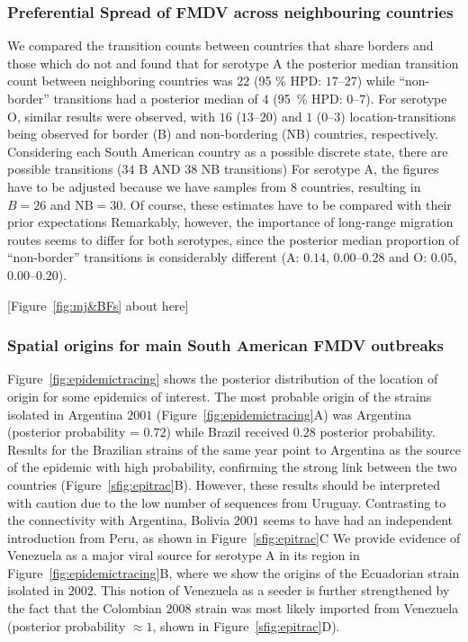 \documentclass[10pt]{article}
\begin{document}
\subsubsection*{Preferential Spread of FMDV across neighbouring countries}
We compared the transition counts between countries that share borders and those which do not and found that for serotype A the posterior median transition count between neighboring countries was  $22$ (95 \% HPD: $17$--$27$) while ``non-border'' transitions had a posterior median of $4$ (95~\% HPD: $0$--$7$). For serotype O, similar results were observed, with $16$ ($13$--$20$) and $1$ ($0$--$3$) location-transitions being observed for border (B) and non-bordering (NB) countries, respectively.
Considering each South American country as a possible discrete state, there are  possible transitions ($34$ B AND $38$ NB transitions)
For serotype A, the figures have to be adjusted because we have samples from $8$ countries, resulting in $B = 26$ and $ \text{NB} = 30$.
Of course, these estimates have to be compared with their prior expectations
Remarkably, however, the importance of long-range migration routes seems to differ for both serotypes, since the posterior median proportion of ``non-border'' transitions is considerably different (A: $0.14$, $0.00$--$0.28$  and O: $0.05$, $0.00$--$0.20$).

\begin{center}
 [Figure~\ref{fig:mj&BFs} about here]
\end{center}

\subsubsection*{Spatial origins for main South American FMDV outbreaks}

Figure~\ref{fig:epidemictracing} shows the posterior distribution of the location of origin for some epidemics of interest.
The most probable origin of the strains isolated in Argentina $2001$ (Figure~\ref{fig:epidemictracing}A) was Argentina (posterior probability = $0.72$) while Brazil received $0.28$ posterior probability.
Results for the Brazilian strains of the same year point to Argentina as the source of the epidemic with high probability, confirming the strong link between the two countries (Figure~\ref{sfig:epitrac}B).
However, these results should be interpreted with caution due to the low number of sequences from Uruguay.
Contrasting to the connectivity with Argentina, Bolivia $2001$ seems to have had an independent introduction from Peru, as shown in Figure~\ref{sfig:epitrac}C
We provide evidence of Venezuela as a major viral source for serotype A in its region in Figure~\ref{fig:epidemictracing}B, where we show the origins of the Ecuadorian strain isolated in $2002$.
This notion of Venezuela as a seeder is further strengthened by the fact that the Colombian $2008$ strain was most likely imported from Venezuela (posterior probability $\approx 1$, shown in Figure~\ref{sfig:epitrac}D).
\end{document}
